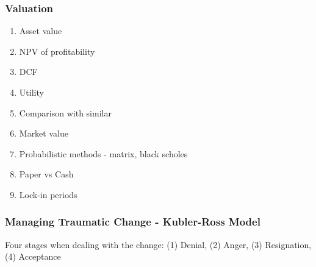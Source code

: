 \documentclass{article}
\begin{document}
\begin{multicols}{2}
\subsubsection{Valuation}
\begin{enumerate}
    \item Asset value
    \item NPV of profitability
    \item DCF
    \item Utility
    \item Comparison with similar
    \item Market value
    \item Probabilistic methods - matrix, black scholes
    \item Paper vs Cash
    \item Lock-in periods
\end{enumerate}

\subsubsection{Managing Traumatic Change - Kubler-Ross Model}
Four stages when dealing with the change: (1) Denial, (2) Anger, (3) Resignation, (4) Acceptance


\end{multicols}
\end{document}
